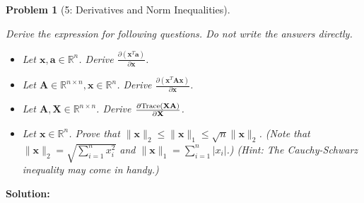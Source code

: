\documentclass[11pt]{exam}
\theoremstyle{quest}
\newtheorem*{question}{Problem}
\newcommand{\R}{\mathbb{R}}
\begin{document}
\begin{question}[5: Derivatives and Norm Inequalities]
~

Derive the expression for following questions. Do not write the answers directly.
\begin{itemize}
\item[(a)] Let $\textbf{x}, \textbf{a} \in \R^n$. Derive
  $\frac{\partial \left(\textbf{x}^T\textbf{a}\right)}{\partial \textbf{x}}$.
\item[(b)] Let $\textbf{A} \in \R^{n \times n}, \textbf{x} \in \R^n$.
  Derive
  $\frac{\partial \left(\textbf{x}^T\textbf{A}\textbf{x} \right)}{\partial
    \textbf{x}}$.
\item[(c)] Let $\textbf{A}, \textbf{X} \in \R^{n\times n}$. Derive
  $\frac{\partial \text{Trace(\textbf{XA})}}{\partial \textbf{X}}$.
\item[(d)] Let $\textbf{x}\in \R^n$. Prove that
  $\|\textbf{x}\|_2 \leq \|\textbf{x}\|_1 \leq \sqrt{n}\|\textbf{x}\|_2$. (Note
  that $\|\textbf{x}\|_2=\sqrt{\sum_{i=1}^{n} x_i^2}$ and
  $\|\textbf{x}\|_1=\sum_{i=1}^{n} |x_i|$.) (Hint: The Cauchy-Schwarz inequality may come in handy.)
\end{itemize}
\end{question}
\textbf{Solution:}








\newpage

\end{document}
